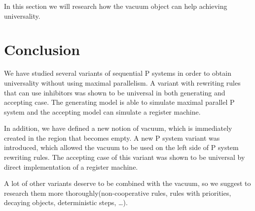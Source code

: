 \documentclass[a4paper,10pt]{article}
\begin{document}
In this section we will research how the vacuum object can help achieving universality.



\section{Conclusion}
\label{sec:conclusion}
We have studied several variants of sequential P systems in order to obtain universality without using maximal parallelism.
A variant with rewriting rules that can use inhibitors was shown to be universal in both generating and accepting case. The generating model is able to simulate maximal parallel P system and the accepting model can simulate a register machine.

In addition, we have defined a new notion of vacuum, which is immediately created in the region that becomes empty. A new P system variant was introduced, which allowed the vacuum to be used on the left side of P system rewriting rules. The accepting case of this variant was shown to be universal by direct implementation of a register machine.

A lot of other variants deserve to be combined with the vacuum, so we suggest to research them more thoroughly(non-cooperative rules, rules with priorities, decaying objects, deterministic steps, \dots).


\end{document}
